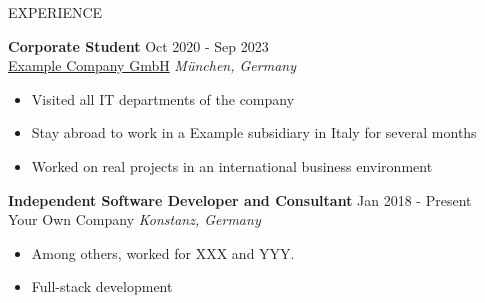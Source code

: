 \documentclass{resume}
\begin{document}
    \begin{rSection}{EXPERIENCE}
    
        \textbf{Corporate Student} \hfill Oct 2020 - Sep 2023\\
        \href{https://www.example.com/}{Example Company GmbH} \hfill \textit{München, Germany}
        \begin{itemize}
        \itemsep -3pt {} 
        \item Visited all IT departments of the company
\item Stay abroad to work in a Example subsidiary in Italy for several months
\item Worked on real projects in an international business environment
        \end{itemize}
        
        \textbf{Independent Software Developer and Consultant} \hfill Jan 2018 - Present\\
        Your Own Company \hfill \textit{Konstanz, Germany}
        \begin{itemize}
        \itemsep -3pt {} 
        \item Among others, worked for XXX and YYY.
\item Full-stack development
        \end{itemize}
        
    \end{rSection}
    \newpage
\end{document}
